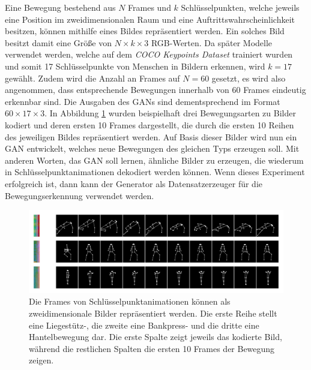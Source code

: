 Eine Bewegung bestehend aus $N$ Frames und $k$ Schlüsselpunkten, welche jeweils
eine Position im zweidimensionalen Raum und eine Auftrittswahrscheinlichkeit
besitzen, können mithilfe eines Bildes repräsentiert werden. Ein solches Bild
besitzt damit eine Größe von $N \times k \times 3$ RGB-Werten. Da später Modelle
verwendet werden, welche auf dem \textit{COCO Keypoints Dataset}
\cite{lin2015microsoft} trainiert wurden und somit 17 Schlüsselpunkte von
Menschen in Bildern erkennen, wird $k = 17$ gewählt. Zudem wird die Anzahl an
Frames auf $N = 60$ gesetzt, es wird also angenommen, dass entsprechende
Bewegungen innerhalb von 60 Frames eindeutig erkennbar sind. Die Ausgaben des
GANs sind dementsprechend im Format $60 \times 17 \times 3$. In Abbildung
\ref{fig:motion-images} wurden beispielhaft drei Bewegungsarten zu Bilder
kodiert und deren ersten 10 Frames dargestellt, die durch die ersten 10 Reihen
des jeweiligen Bildes repräsentiert werden. Auf Basis dieser Bilder wird nun ein
GAN entwickelt, welches neue Bewegungen des gleichen Typs erzeugen soll. Mit
anderen Worten, das GAN soll lernen, ähnliche Bilder zu erzeugen, die wiederum
in Schlüsselpunktanimationen dekodiert werden können.  Wenn dieses Experiment
erfolgreich ist, dann kann der Generator als Datensatzerzeuger für die
Bewegungserkennung verwendet werden.

\begin{figure}
    \includegraphics[width=\textwidth]{images/motion_image.png}
    \caption{Die Frames von Schlüsselpunktanimationen können als
    zweidimensionale Bilder repräsentiert werden. Die erste Reihe stellt eine
    Liegestütz-, die zweite eine Bankpress- und die dritte eine Hantelbewegung
    dar. Die erste Spalte zeigt jeweils das kodierte Bild, während die
    restlichen Spalten die ersten 10 Frames der Bewegung zeigen.}
    \label{fig:motion-images}
\end{figure}

